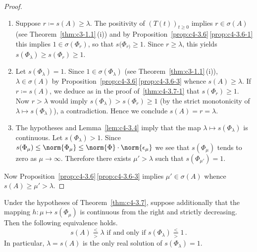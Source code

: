\begin{proof}
\begin{enumerate}[\upshape (i), wide, labelindent=.25em] 
\item%
Suppose $r \coloneqq s(A) \geq \lambda$. 
The positivity of\/ $(T(t))_{t \geq 0}$ implies $r \in \sigma(A)$ (see Theorem~\ref{thm:c3-1.1}\,(i)) and by Proposition~\ref{prop:c4-3.6}\,\ref{prop:c4-3.6-1}  this implies $1 \in \sigma(\Phi_r)$, so that $s(\Phi_{r)} \geq 1$. 
Since $r \geq \lambda$, this yields $s(\Phi_{\lambda}) \geq s(\Phi_{r}) \geq 1$.

\item 
Let $s(\Phi_{\lambda}) = 1$. 
Since $1 \in \sigma(\Phi_{\lambda})$ (see Theorem~\ref{thm:c3-1.1}\,(i)), $\lambda \in \sigma(A)$ by Proposition~\ref{prop:c4-3.6}\,\ref{prop:c4-3.6-3} whence $s(A) \geq \lambda$. 
If\/ $r \coloneqq s(A)$, we deduce as in the proof of~\ref{thm:c4-3.7-1} that $s(\Phi_{r}) \geq 1$. 
Now $r > \lambda$ would imply $s(\Phi_{\lambda}) > s(\Phi_{r}) \geq 1$ (by the strict monotonicity of\/ $\lambda \mapsto s(\Phi_{\lambda})$), a contradiction. Hence we conclude $s(A) = r = \lambda$.

\item 
The hypotheses and Lemma~\ref{lem:c4-3.4} imply that the map $\lambda \mapsto s(\Phi_{\lambda})$ is continuous. 
Let $s(\Phi_{\lambda}) > 1$. 
Since $s(\Phi_{\mu}) \leq \norm{\Phi_{\mu}} \leq \norm{\Phi} \cdot \norm{\epsilon_{\mu}}$ we see that $s(\Phi_{\mu})$ tends to zero as $\mu \to \infty$. 
Therefore there exists $\mu' > \lambda$ such that $s(\Phi_{\mu'}) = 1$. 
\end{enumerate} 
Now Proposition~\ref{prop:c4-3.6}\,\ref{prop:c4-3.6-3}  implies $\mu' \in \sigma(A)$ whence $s(A) \geq \mu' > \lambda$.
\end{proof}
\begin{corollary}\label{cor:c4-3.8}
%
Under the hypotheses of Theorem~\ref{thm:c4-3.7}, suppose additionally that the mapping $h: \mu \mapsto s(\Phi_{\mu})$ is continuous from the right and strictly decreasing. Then the following equivalence holds.
\begin{equation}\label{eq:c4-3.9}
s(A) 
\overset{<}{ \underset{>}{=} }
\lambda 
\text{ if and only if } 
s(\Phi_{\lambda}) 
\overset{<}{ \underset{>}{=} }
1\,.
\end{equation}
In particular, $\lambda = s(A)$ is the only real solution of\/ $s(\Phi_{\lambda}) = 1$.
\end{corollary}
